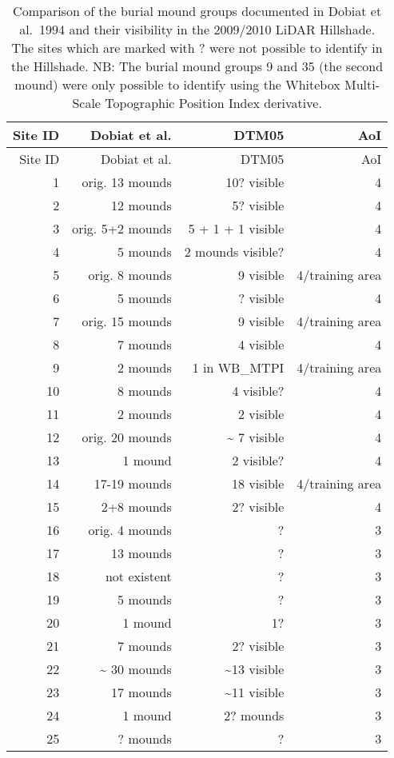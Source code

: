 \documentclass[
  12pt,
]{article}
\begin{document}
\begin{longtable}[]{@{}rrrr@{}}
\caption{Comparison of the burial mound groups documented in Dobiat et al.~1994 and their visibility in the 2009/2010 LiDAR Hillshade. The sites which are marked with ? were not possible to identify in the Hillshade. NB: The burial mound groups 9 and 35 (the second mound) were only possible to identify using the Whitebox Multi-Scale Topographic Position Index derivative.}\tabularnewline
\toprule
Site ID & Dobiat et al. & DTM05 & AoI \\
\midrule
\endfirsthead
\toprule
Site ID & Dobiat et al. & DTM05 & AoI \\
\midrule
\endhead
1 & orig. 13 mounds & 10? visible & 4 \\
2 & 12 mounds & 5? visible & 4 \\
3 & orig. 5+2 mounds & 5 + 1 + 1 visible & 4 \\
4 & 5 mounds & 2 mounds visible? & 4 \\
5 & orig. 8 mounds & 9 visible & 4/training area \\
6 & 5 mounds & ? visible & 4 \\
7 & orig. 15 mounds & 9 visible & 4/training area \\
8 & 7 mounds & 4 visible & 4 \\
9 & 2 mounds & 1 in WB\_MTPI & 4/training area \\
10 & 8 mounds & 4 visible? & 4 \\
11 & 2 mounds & 2 visible & 4 \\
12 & orig. 20 mounds & \textasciitilde{} 7 visible & 4 \\
13 & 1 mound & 2 visible? & 4 \\
14 & 17-19 mounds & 18 visible & 4/training area \\
15 & 2+8 mounds & 2? visible & 4 \\
16 & orig. 4 mounds & ? & 3 \\
17 & 13 mounds & ? & 3 \\
18 & not existent & ? & 3 \\
19 & 5 mounds & ? & 3 \\
20 & 1 mound & 1? & 3 \\
21 & 7 mounds & 2? visible & 3 \\
22 & \textasciitilde{} 30 mounds & \textasciitilde13 visible & 3 \\
23 & 17 mounds & \textasciitilde11 visible & 3 \\
24 & 1 mound & 2? mounds & 3 \\
25 & ? mounds & ? & 3 \\

\end{longtable}
\end{document}
